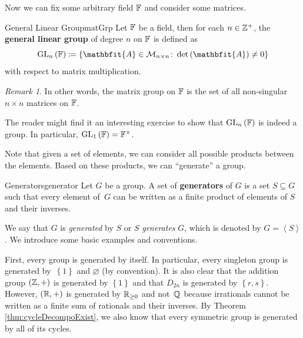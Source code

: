 \documentclass[math]{amznotes}
\theoremstyle{remark}
\newtheorem*{remark}{Remark}
\newcommand{\0}{\mathbf{0}}
\newcommand{\1}{\mathbf{1}}
\begin{document}
Now we can fix some arbitrary field $\mathbb{F}$ and consider some matrices.
\begin{dfnbox}{General Linear Group}{matGrp}
    Let $\mathbb{F}$ be a field, then for each $n \in \mathbb{Z}^+$, the {\color{red} \textbf{general linear group}} of degree $n$ on $\mathbb{F}$ is defined as 
    \begin{equation*}
        \mathrm{GL}_n\left(\F\right) \coloneqq \left\{\mathbfit{A} \in \mathcal{M}_{n \times n} \colon \det\left(\mathbfit{A}\right) \neq 0\right\}
    \end{equation*}
    with respect to matrix multiplication.
\end{dfnbox}
\begin{notebox}
    \begin{remark}
        In other words, the matrix group on $\mathbb{F}$ is the set of all non-singular $n \times n$ matrices on $\mathbb{F}$.
    \end{remark}
\end{notebox}
The reader might find it an interesting exercise to show that $\mathrm{GL}_n\left(\mathbb{F}\right)$ is indeed a group. In particular, $\mathrm{GL}_1\left(\mathbb{F}\right) = \mathbb{F}^{\times}$.

Note that given a set of elements, we can consider all possible products between the elements. Based on these products, we can ``generate'' a group.
\begin{dfnbox}{Generators}{generator}
    Let $G$ be a group. A set of {\color{red} \textbf{generators}} of $G$ is a set $S \subseteq G$ such that every element of~$G$ can be written as a finite product of elements of $S$ and their inverses.
\end{dfnbox}
We say that $G$ is \textit{generated} by $S$ or $S$ \textit{generates} $G$, which is denoted by $G = \left\langle S \right\rangle$. We introduce some basic examples and conventions.

First, every group is generated by itself. In particular, every singleton group is generated by~$\left\{1\right\}$ and $\varnothing$ (by convention). It is also clear that the addition group $\left(\mathbb{Z}, +\right)$ is generated by $\left\{1\right\}$ and that $D_{2n}$ is generated by $\left\{r, s\right\}$. However, $\left(\mathbb{R}, +\right)$ is generated by $\mathbb{R}_{\geq 0}$ and not~$\mathbb{Q}$ because irrationals cannot be written as a finite sum of rationals and their inverses. By Theorem \ref{thm:cycleDecompoExist}, we also know that every symmetric group is generated by all of its cycles.
\end{document}
